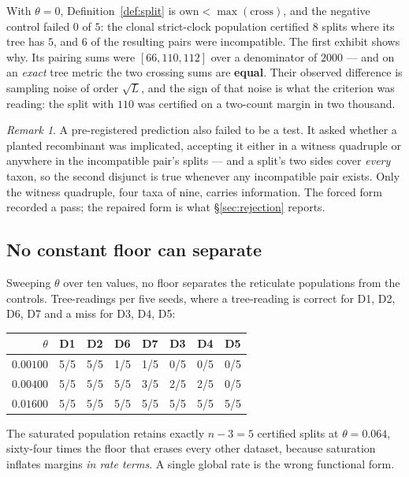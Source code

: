 \documentclass[11pt,a4paper]{article}
\theoremstyle{definition}
\theoremstyle{remark}
\newtheorem{remark}{Remark}[section]
\begin{document}
With $\theta = 0$, Definition~\ref{def:split} is $\mathrm{own} <
\max(\mathrm{cross})$, and the negative control failed $0$ of $5$: the clonal
strict-clock population certified $8$ splits where its tree has $5$, and $6$ of
the resulting pairs were incompatible. The first exhibit shows why. Its pairing
sums were $[66, 110, 112]$ over a denominator of $2000$ --- and on an \emph{exact}
tree metric the two crossing sums are \textbf{equal}. Their observed difference
is sampling noise of order $\sqrt{L}$, and the sign of that noise is what the
criterion was reading: the split with $110$ was certified on a two-count margin
in two thousand.

\begin{remark}
A pre-registered prediction also failed to be a test. It asked whether a planted
recombinant was implicated, accepting it either in a witness quadruple or
anywhere in the incompatible pair's splits --- and a split's two sides cover
\emph{every} taxon, so the second disjunct is true whenever any incompatible pair
exists. Only the witness quadruple, four taxa of nine, carries information. The
forced form recorded a pass; the repaired form is what \S\ref{sec:rejection}
reports.
\end{remark}

\subsection{No constant floor can separate}\label{sec:noconstant}

Sweeping $\theta$ over ten values, no floor separates the reticulate populations
from the controls. Tree-readings per five seeds, where a tree-reading is correct
for D1, D2, D6, D7 and a miss for D3, D4, D5:

\begin{center}\footnotesize
\begin{tabular}{@{}rccccccc@{}}
\toprule
$\theta$ & D1 & D2 & D6 & D7 & D3 & D4 & D5 \\
\midrule
$0.00100$ & 5/5 & 5/5 & 1/5 & 1/5 & 0/5 & 0/5 & 0/5 \\
$0.00400$ & 5/5 & 5/5 & 5/5 & 3/5 & 2/5 & 2/5 & 0/5 \\
$0.01600$ & 5/5 & 5/5 & 5/5 & 5/5 & 5/5 & 5/5 & 5/5 \\
\bottomrule
\end{tabular}
\end{center}

The saturated population retains exactly $n-3 = 5$ certified splits at
$\theta = 0.064$, sixty-four times the floor that erases every other dataset,
because saturation inflates margins \emph{in rate terms}. A single global rate is
the wrong functional form.
\end{document}
